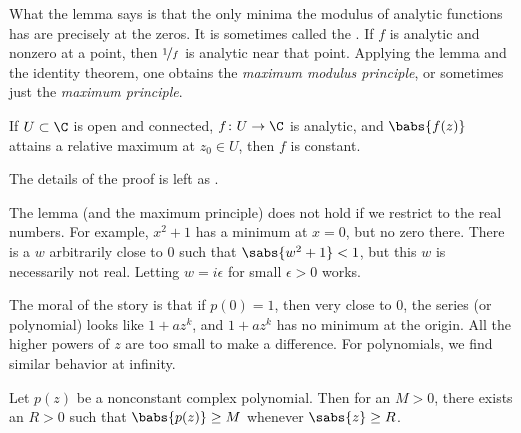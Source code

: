 What the lemma
says is that the only minima the modulus of analytic functions
has are precisely at the zeros.
It is sometimes called the \emph{}.
If $f$ is analytic and nonzero at a point,
then $\nicefrac{1}{f}$ is analytic near that point.  Applying the lemma and
the identity theorem, one obtains the \emph{maximum modulus principle}, or sometimes
just the \emph{maximum principle}.

\begin{thm}%
%
\label{thm:maxprinciple}
If $U \subset \C$ is open and connected,
$f \colon U \to \C$ is analytic, and $\babs{f(z)}$ attains a relative
maximum at $z_0 \in U$, then $f$ is constant.
\end{thm}

The details of the proof is left as .

\begin{remark}
The lemma (and the maximum principle) does not hold if we restrict to the real numbers.  For
example, $x^2+1$ has a minimum at $x=0$, but no zero there.
There is a $w$ arbitrarily close to $0$ such that $\sabs{w^2+1} < 1$, but this
$w$ is necessarily not real.  Letting $w = i\epsilon$ for small
$\epsilon > 0$ works.
\end{remark}

The moral of the story is that if $p(0) = 1$, then very close to 0, the
series (or polynomial)
looks like $1+az^k$, and $1+az^k$ has no minimum at the origin.  All the higher
powers of $z$ are too small to make a difference.  For polynomials, we find similar behavior
at infinity.

\begin{lemma}
Let $p(z)$ be a nonconstant complex polynomial.  Then for an $M > 0$, there exists
an $R > 0$ such that
$\babs{p(z)} \geq M$ whenever $\sabs{z} \geq R$.
\end{lemma}

